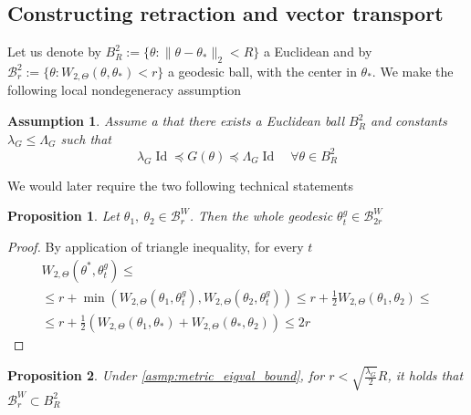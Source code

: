 \documentclass{article} %
\newtheorem{assumption}{Assumption}[section]
\newtheorem{proposition}{Proposition}[section]
\numberwithin{equation}{subsection}
\numberwithin{theorem}{section}
\newcommand{\cB}{\mathcal{B}}
\newcommand{\Id}{\operatorname{Id}}
\begin{document}
    \subsection{Constructing retraction and vector transport}\label{app:ret_vect_trans}
    Let us denote by $B^2_R := \{\theta: \|\theta - \theta_*\|_2 < R \}$ a Euclidean and by $\cB^2_r := \{ \theta: W_{2,\Theta}(\theta, \theta_*) < r \}$ a geodesic ball, with the center in $\theta_*$.
    We make the following local nondegeneracy assumption
    \begin{assumption}
        Assume a that there exists a Euclidean ball $B^2_R$ and constants $\lambda_{G} \leq \Lambda_{G}$ such that 
        \begin{equation}\label{eq:metric_eigval_bound}
            \lambda_{G}\Id \preceq G(\theta) \preceq \Lambda_{G} \Id\quad \forall \theta\in B^2_R
        \end{equation}
    \end{assumption}
    We would later require the two following technical statements
    \begin{proposition}\label{prop:geodesic_in_ball}
        Let $\theta_1,\ \theta_2 \in \cB^W_{r}$.
        Then the whole geodesic $\theta_t^g \in \cB^W_{2r}$
    \end{proposition}
    \begin{proof}
        By application of triangle inequality, for every $t$
        \begin{multline*}
            W_{2,\Theta}(\theta^*, \theta_t^g) \leq \\
            \leq r + \min(W_{2,\Theta}(\theta_1, \theta_t^g), W_{2,\Theta}(\theta_2, \theta_t^g)) 
            \leq r + \frac{1}{2}W_{2,\Theta}(\theta_1, \theta_2) \leq \\
            \leq r + \frac{1}{2}\left(W_{2,\Theta}(\theta_1, \theta_*) + W_{2,\Theta}(\theta_*, \theta_2)\right) \leq 2r
        \end{multline*}
    \end{proof}
    \begin{proposition}\label{prop:geodesic_in_l2}
        Under \autoref{asmp:metric_eigval_bound}, for $r < \sqrt{\frac{\lambda_{G}}{2}}R$, it holds that $\cB^W_r \subset B^2_R$
    \end{proposition}
\end{document}
